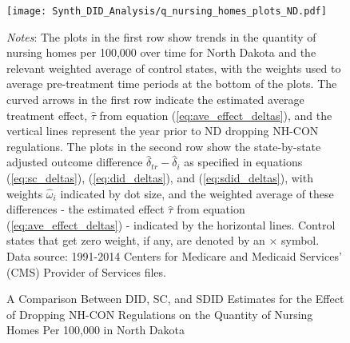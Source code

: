 \documentclass[../Main.tex]{subfiles}
\begin{document}
\newpage
\begin{figure}[t] 
	\begin{center}
	\caption{\label{fig:q_nh_plots_nd} \centering A Comparison Between DID, SC, and SDID Estimates for the Effect of Dropping NH-CON Regulations on the Quantity of Nursing Homes Per 100,000 in North Dakota}
    \texttt{[image: Synth\_DID\_Analysis/q\_nursing\_homes\_plots\_ND.pdf]}
    \end{center}
    \footnotesize
		\textit{Notes}: The plots in the first row show trends in the quantity of nursing homes per 100,000 over time for North Dakota and the relevant weighted average of control states, with the weights used to average pre-treatment time periods at the bottom of the plots. The curved arrows in the first row indicate the estimated average treatment effect, $\hat{\tau}$ from equation (\ref{eq:ave_effect_deltas}), and the vertical lines represent the year prior to ND dropping NH-CON regulations. The plots in the second row show the state-by-state adjusted outcome difference $\hat{\delta}_{tr}-\hat{\delta}_i$ as specified in equations (\ref{eq:sc_deltas}), (\ref{eq:did_deltas}), and (\ref{eq:sdid_deltas}), with weights $\hat{\omega}_i$ indicated by dot size, and the weighted average of these differences - the estimated effect $\hat{\tau}$ from equation (\ref{eq:ave_effect_deltas}) - indicated by the horizontal lines. Control states that get zero weight, if any, are denoted by an $\times$ symbol. Data source: 1991-2014 Centers for Medicare and Medicaid Services’ (CMS) Provider of Services files.
\end{figure}
\clearpage
\end{document}
